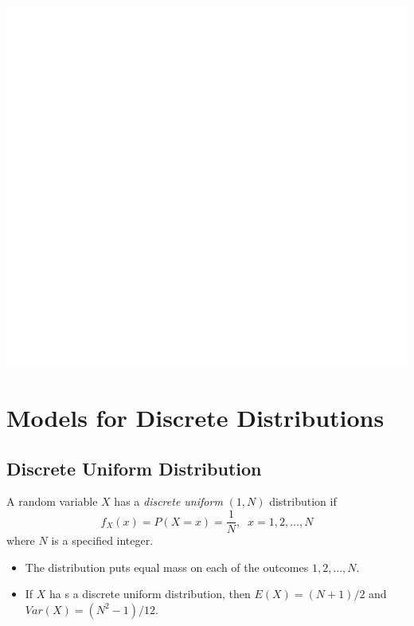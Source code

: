 \documentclass[]{book}
\begin{document}
\begin{center}\includegraphics[width=1\linewidth]{figure/Ch1box14-1} \end{center}

\newpage

\hypertarget{models-for-discrete-distributions}{%
\section{Models for Discrete Distributions}\label{models-for-discrete-distributions}}

\hypertarget{discrete-uniform-distribution}{%
\subsection{Discrete Uniform Distribution}\label{discrete-uniform-distribution}}

A random variable \(X\) has a \emph{discrete uniform} \((1, N)\) distribution if
\[f_X(x)= P(X=x)=\frac{1}{N}, \;\; x=1,2,\dots, N\]
where \(N\) is a specified integer.

\begin{itemize}
\item
  The distribution puts equal mass on each of the outcomes \(1,2,\dots, N.\)
\item
  If \(X\) ha s a discrete uniform distribution, then \(E(X) = (N+1)/2\) and \(Var(X) = (N^2-1)/12.\)
\end{itemize}
\end{document}
